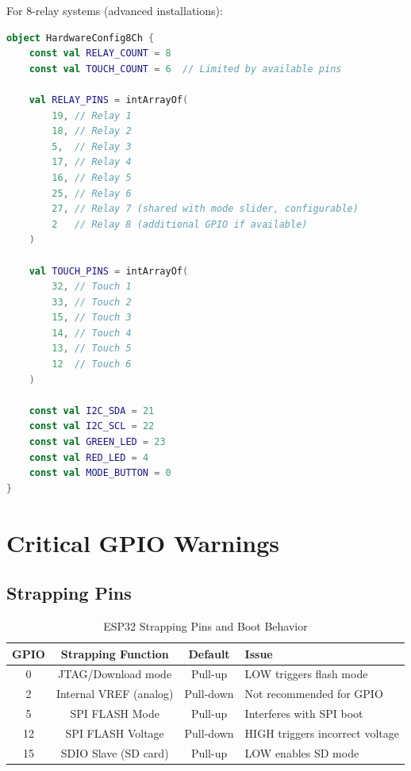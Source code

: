For 8-relay systems (advanced installations):

\begin{lstlisting}[language=Kotlin, caption=8-Channel GPIO Configuration, label=lst:gpio_8ch]
object HardwareConfig8Ch {
    const val RELAY_COUNT = 8
    const val TOUCH_COUNT = 6  // Limited by available pins
    
    val RELAY_PINS = intArrayOf(
        19, // Relay 1
        18, // Relay 2
        5,  // Relay 3
        17, // Relay 4
        16, // Relay 5
        25, // Relay 6
        27, // Relay 7 (shared with mode slider, configurable)
        2   // Relay 8 (additional GPIO if available)
    )
    
    val TOUCH_PINS = intArrayOf(
        32, // Touch 1
        33, // Touch 2
        15, // Touch 3
        14, // Touch 4
        13, // Touch 5
        12  // Touch 6
    )
    
    const val I2C_SDA = 21
    const val I2C_SCL = 22
    const val GREEN_LED = 23
    const val RED_LED = 4
    const val MODE_BUTTON = 0
}
\end{lstlisting}

\section{Critical GPIO Warnings}

\subsection{Strapping Pins}

\begin{table}[H]
\centering
\caption{ESP32 Strapping Pins and Boot Behavior}
\label{tbl:strapping_pins}
\begin{tabular}{|c|c|c|l|}
\hline
\textbf{GPIO} & \textbf{Strapping Function} & \textbf{Default} & \textbf{Issue} \\
\hline
0 & JTAG/Download mode & Pull-up & LOW triggers flash mode \\
\hline
2 & Internal VREF (analog) & Pull-down & Not recommended for GPIO \\
\hline
5 & SPI FLASH Mode & Pull-up & Interferes with SPI boot \\
\hline
12 & SPI FLASH Voltage & Pull-down & HIGH triggers incorrect voltage \\
\hline
15 & SDIO Slave (SD card) & Pull-up & LOW enables SD mode \\
\hline
\end{tabular}
\end{table}

